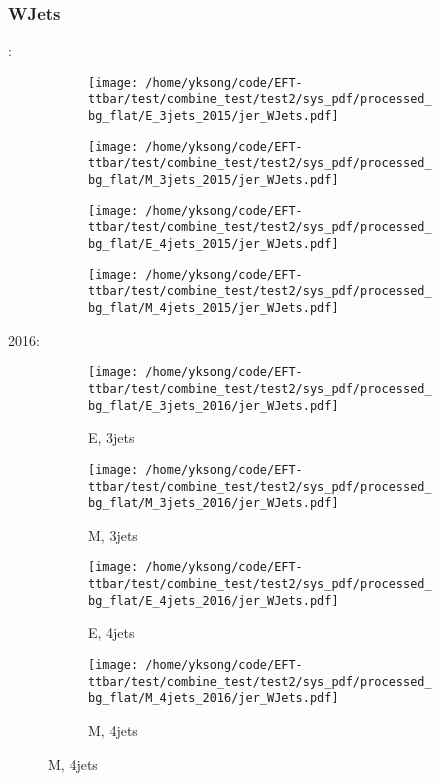\documentclass{beamer}
\begin{document}
\begin{frame}
\frametitle{WJets}
\fontsize{5}{1}:
\begin{figure}
\centering
\begin{subfigure}[b]{0.24\textwidth}
\texttt{[image: /home/yksong/code/EFT-ttbar/test/combine\_test/test2/sys\_pdf/processed\_bg\_flat/E\_3jets\_2015/jer\_WJets.pdf]}
\end{subfigure}
\begin{subfigure}[b]{0.24\textwidth}
\texttt{[image: /home/yksong/code/EFT-ttbar/test/combine\_test/test2/sys\_pdf/processed\_bg\_flat/M\_3jets\_2015/jer\_WJets.pdf]}
\end{subfigure}
\begin{subfigure}[b]{0.24\textwidth}
\texttt{[image: /home/yksong/code/EFT-ttbar/test/combine\_test/test2/sys\_pdf/processed\_bg\_flat/E\_4jets\_2015/jer\_WJets.pdf]}
\end{subfigure}
\begin{subfigure}[b]{0.24\textwidth}
\texttt{[image: /home/yksong/code/EFT-ttbar/test/combine\_test/test2/sys\_pdf/processed\_bg\_flat/M\_4jets\_2015/jer\_WJets.pdf]}
\end{subfigure}
\end{figure}
2016:
\begin{figure}
\centering
\begin{subfigure}[b]{0.24\textwidth}
\texttt{[image: /home/yksong/code/EFT-ttbar/test/combine\_test/test2/sys\_pdf/processed\_bg\_flat/E\_3jets\_2016/jer\_WJets.pdf]}
\captionsetup{font=tiny}
\caption{E, 3jets}
\end{subfigure}
\begin{subfigure}[b]{0.24\textwidth}
\texttt{[image: /home/yksong/code/EFT-ttbar/test/combine\_test/test2/sys\_pdf/processed\_bg\_flat/M\_3jets\_2016/jer\_WJets.pdf]}
\captionsetup{font=tiny}
\caption{M, 3jets}
\end{subfigure}
\begin{subfigure}[b]{0.24\textwidth}
\texttt{[image: /home/yksong/code/EFT-ttbar/test/combine\_test/test2/sys\_pdf/processed\_bg\_flat/E\_4jets\_2016/jer\_WJets.pdf]}
\captionsetup{font=tiny}
\caption{E, 4jets}
\end{subfigure}
\begin{subfigure}[b]{0.24\textwidth}
\texttt{[image: /home/yksong/code/EFT-ttbar/test/combine\_test/test2/sys\_pdf/processed\_bg\_flat/M\_4jets\_2016/jer\_WJets.pdf]}
\captionsetup{font=tiny}
\caption{M, 4jets}
\end{subfigure}
\end{figure}
\end{frame}
\end{document}
